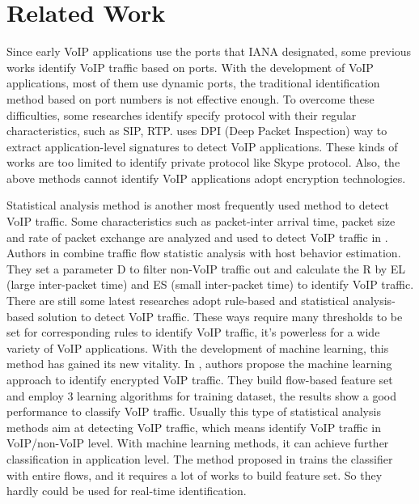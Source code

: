 \documentclass[conference]{IEEEtran}
\begin{document}
\section{Related Work}
\label{sec:relatedwork}


Since early VoIP applications use the ports that IANA designated, some previous works identify VoIP traffic based on ports. With the development of VoIP applications, most of them use dynamic ports, the traditional identification method based on port numbers is not effective enough. To overcome these difficulties, some researches \cite{14,16} identify specify protocol with their regular characteristics, such as SIP, RTP. \cite{18} uses DPI (Deep Packet Inspection) way to extract application-level signatures to detect VoIP applications. These kinds of works are too limited to identify private protocol like Skype protocol. Also, the above methods cannot identify VoIP applications adopt encryption technologies.

Statistical analysis method is another most frequently used method to detect VoIP traffic. Some characteristics such as packet-inter arrival time, packet size and rate of packet exchange are analyzed and used to detect VoIP traffic in \cite{2}. Authors in \cite{19} combine traffic flow statistic analysis with host behavior estimation. They set a parameter D to filter non-VoIP traffic out and calculate the R by EL (large inter-packet time) and ES (small inter-packet time) to identify VoIP traffic. There are still some latest researches \cite{20,21} adopt rule-based and statistical analysis-based solution to detect VoIP traffic. These ways require many thresholds to be set for corresponding rules to identify VoIP traffic, it's powerless for a wide variety of VoIP applications. With the development of machine learning, this method has gained its new vitality. In \cite{5}, authors propose the machine learning approach to identify encrypted VoIP traffic. They build flow-based feature set and employ 3 learning algorithms for training dataset, the results show a good performance to classify VoIP traffic. Usually this type of statistical analysis methods aim at detecting VoIP traffic, which means identify VoIP traffic in VoIP/non-VoIP level. With machine learning methods, it can achieve further classification in application level. The method proposed in \cite{5} trains the classifier with entire flows, and it requires a lot of works to build feature set. So they hardly could be used for real-time identification.
\end{document}
